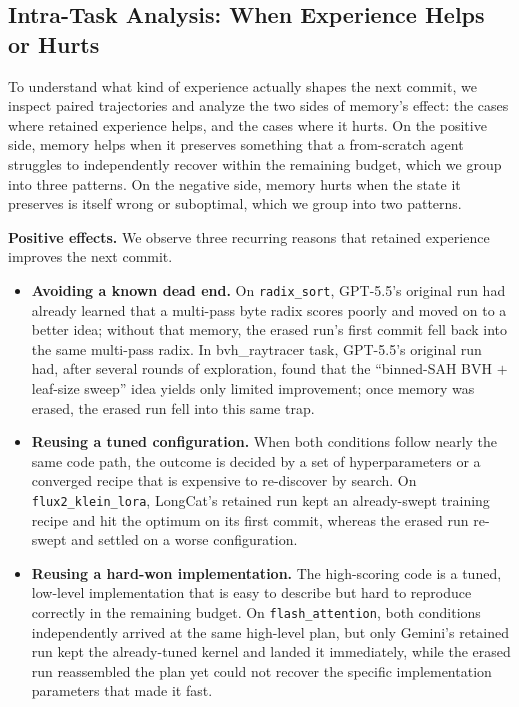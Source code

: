 \subsection{Intra-Task Analysis: When Experience Helps or Hurts}
\label{sec:in_task_traj}

To understand what kind of experience actually shapes the next commit, we inspect paired trajectories and analyze the two sides of memory's effect: the cases where retained experience helps, and the cases where it hurts. On the positive side, memory helps when it preserves something that a from-scratch agent struggles to independently recover within the remaining budget, which we group into three patterns. On the negative side, memory hurts when the state it preserves is itself wrong or suboptimal, which we group into two patterns.

\textbf{Positive effects.}
We observe three recurring reasons that retained experience improves the next commit.
\begin{itemize}
  \item \textbf{Avoiding a known dead end.} 
  On \texttt{radix\_sort}, GPT-5.5's original run had already learned that a multi-pass byte radix scores poorly and moved on to a better idea; without that memory, the erased run's first commit fell back into the same multi-pass radix.
  In bvh\_raytracer task, GPT-5.5's original run had, after several rounds of exploration, found that the ``binned-SAH BVH $+$ leaf-size sweep'' idea yields only limited improvement; once memory was erased, the 
  erased run fell into this same trap.

  \item \textbf{Reusing a tuned configuration.} When both conditions follow nearly the same code path, the outcome is decided by a set of hyperparameters or a converged recipe that is expensive to re-discover by search. On \texttt{flux2\_klein\_lora}, LongCat's retained run kept an already-swept training recipe and hit the optimum on its first commit, whereas the erased run re-swept and settled on a worse configuration.

  \item \textbf{Reusing a hard-won implementation.} The high-scoring code is a tuned, low-level implementation that is easy to describe but hard to reproduce correctly in the remaining budget. On \texttt{flash\_attention}, both conditions independently arrived at the same high-level plan, but only Gemini's retained run kept the already-tuned kernel and landed it immediately, while the erased run reassembled the plan yet could not recover the specific implementation parameters that made it fast.
\end{itemize}

